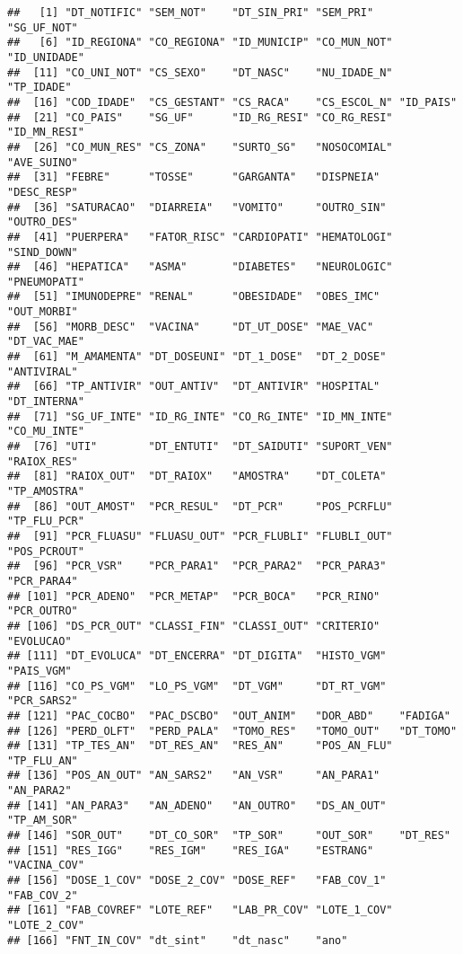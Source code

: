 \documentclass[
]{article}
\begin{document}
\begin{verbatim}
##   [1] "DT_NOTIFIC" "SEM_NOT"    "DT_SIN_PRI" "SEM_PRI"    "SG_UF_NOT" 
##   [6] "ID_REGIONA" "CO_REGIONA" "ID_MUNICIP" "CO_MUN_NOT" "ID_UNIDADE"
##  [11] "CO_UNI_NOT" "CS_SEXO"    "DT_NASC"    "NU_IDADE_N" "TP_IDADE"  
##  [16] "COD_IDADE"  "CS_GESTANT" "CS_RACA"    "CS_ESCOL_N" "ID_PAIS"   
##  [21] "CO_PAIS"    "SG_UF"      "ID_RG_RESI" "CO_RG_RESI" "ID_MN_RESI"
##  [26] "CO_MUN_RES" "CS_ZONA"    "SURTO_SG"   "NOSOCOMIAL" "AVE_SUINO" 
##  [31] "FEBRE"      "TOSSE"      "GARGANTA"   "DISPNEIA"   "DESC_RESP" 
##  [36] "SATURACAO"  "DIARREIA"   "VOMITO"     "OUTRO_SIN"  "OUTRO_DES" 
##  [41] "PUERPERA"   "FATOR_RISC" "CARDIOPATI" "HEMATOLOGI" "SIND_DOWN" 
##  [46] "HEPATICA"   "ASMA"       "DIABETES"   "NEUROLOGIC" "PNEUMOPATI"
##  [51] "IMUNODEPRE" "RENAL"      "OBESIDADE"  "OBES_IMC"   "OUT_MORBI" 
##  [56] "MORB_DESC"  "VACINA"     "DT_UT_DOSE" "MAE_VAC"    "DT_VAC_MAE"
##  [61] "M_AMAMENTA" "DT_DOSEUNI" "DT_1_DOSE"  "DT_2_DOSE"  "ANTIVIRAL" 
##  [66] "TP_ANTIVIR" "OUT_ANTIV"  "DT_ANTIVIR" "HOSPITAL"   "DT_INTERNA"
##  [71] "SG_UF_INTE" "ID_RG_INTE" "CO_RG_INTE" "ID_MN_INTE" "CO_MU_INTE"
##  [76] "UTI"        "DT_ENTUTI"  "DT_SAIDUTI" "SUPORT_VEN" "RAIOX_RES" 
##  [81] "RAIOX_OUT"  "DT_RAIOX"   "AMOSTRA"    "DT_COLETA"  "TP_AMOSTRA"
##  [86] "OUT_AMOST"  "PCR_RESUL"  "DT_PCR"     "POS_PCRFLU" "TP_FLU_PCR"
##  [91] "PCR_FLUASU" "FLUASU_OUT" "PCR_FLUBLI" "FLUBLI_OUT" "POS_PCROUT"
##  [96] "PCR_VSR"    "PCR_PARA1"  "PCR_PARA2"  "PCR_PARA3"  "PCR_PARA4" 
## [101] "PCR_ADENO"  "PCR_METAP"  "PCR_BOCA"   "PCR_RINO"   "PCR_OUTRO" 
## [106] "DS_PCR_OUT" "CLASSI_FIN" "CLASSI_OUT" "CRITERIO"   "EVOLUCAO"  
## [111] "DT_EVOLUCA" "DT_ENCERRA" "DT_DIGITA"  "HISTO_VGM"  "PAIS_VGM"  
## [116] "CO_PS_VGM"  "LO_PS_VGM"  "DT_VGM"     "DT_RT_VGM"  "PCR_SARS2" 
## [121] "PAC_COCBO"  "PAC_DSCBO"  "OUT_ANIM"   "DOR_ABD"    "FADIGA"    
## [126] "PERD_OLFT"  "PERD_PALA"  "TOMO_RES"   "TOMO_OUT"   "DT_TOMO"   
## [131] "TP_TES_AN"  "DT_RES_AN"  "RES_AN"     "POS_AN_FLU" "TP_FLU_AN" 
## [136] "POS_AN_OUT" "AN_SARS2"   "AN_VSR"     "AN_PARA1"   "AN_PARA2"  
## [141] "AN_PARA3"   "AN_ADENO"   "AN_OUTRO"   "DS_AN_OUT"  "TP_AM_SOR" 
## [146] "SOR_OUT"    "DT_CO_SOR"  "TP_SOR"     "OUT_SOR"    "DT_RES"    
## [151] "RES_IGG"    "RES_IGM"    "RES_IGA"    "ESTRANG"    "VACINA_COV"
## [156] "DOSE_1_COV" "DOSE_2_COV" "DOSE_REF"   "FAB_COV_1"  "FAB_COV_2" 
## [161] "FAB_COVREF" "LOTE_REF"   "LAB_PR_COV" "LOTE_1_COV" "LOTE_2_COV"
## [166] "FNT_IN_COV" "dt_sint"    "dt_nasc"    "ano"
\end{verbatim}
\end{document}
